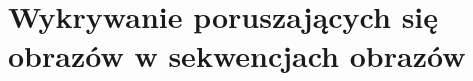 \chapter{Wykrywanie poruszających się obrazów w sekwencjach obrazów}
\label{cha:Wykrywanie_poruszajacych_sie_obiektow}